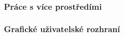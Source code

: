 \subsubsection{Práce s více prostředími}
\label{multiple environments}

\subsubsection{Grafické uživatelské rozhraní}
